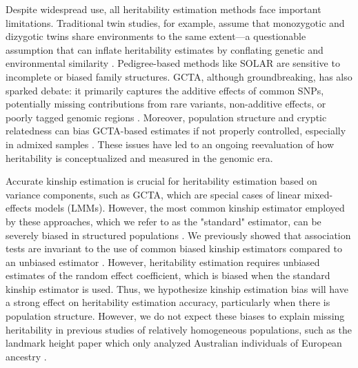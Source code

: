 \documentclass[11pt]{article}
\begin{document}
Despite widespread use, all heritability estimation methods face important limitations. Traditional twin studies, for example, assume that monozygotic and dizygotic twins share environments to the same extent—a questionable assumption that can inflate heritability estimates by conflating genetic and environmental similarity \citep{tenesa2013heritability, charney2012behavior}. Pedigree-based methods like SOLAR are sensitive to incomplete or biased family structures. GCTA, although groundbreaking, has also sparked debate: it primarily captures the additive effects of common SNPs, potentially missing contributions from rare variants, non-additive effects, or poorly tagged genomic regions \citep{speed2012improved,speed2017reevaluation, zaitlen2013using,yang2017concepts}. 
Moreover, population structure and cryptic relatedness can bias GCTA-based estimates if not properly controlled, especially in admixed samples \citep{price2010new,yang2017concepts,huang_interpreting_2025}.
These issues have led to an ongoing reevaluation of how heritability is conceptualized and measured in the genomic era. 

Accurate kinship estimation is crucial for heritability estimation based on variance components, such as GCTA, which are special cases of linear mixed-effects models (LMMs). However, the most common kinship estimator employed by these approaches, which we refer to as the "standard" estimator, can be severely biased in structured populations \citep{ochoa_estimating_2021}. We previously showed that association tests are invariant to the use of common biased kinship estimators compared to an unbiased estimator \citep{hou2023genetic}. However, heritability estimation requires unbiased estimates of the random effect coefficient, which is biased when the standard kinship estimator is used.  Thus, we hypothesize kinship estimation bias will have a strong effect on heritability estimation accuracy, particularly when there is population structure.
However, we do not expect these biases to explain missing heritability in previous studies of relatively homogeneous populations, such as the landmark height paper which only analyzed Australian individuals of European ancestry \citep{yang_common_2010}.
\end{document}

